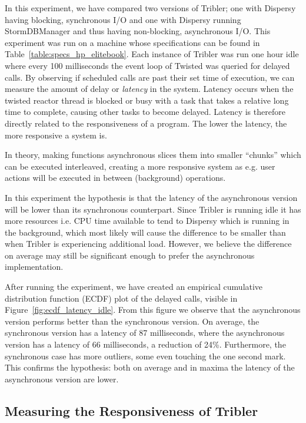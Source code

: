 In this experiment, we have compared two versions of Tribler; one with Dispersy having blocking, synchronous I/O and one with Dispersy running StormDBManager and thus having non-blocking, asynchronous I/O.
This experiment was run on a machine whose specifications can be found in Table~\ref{table:specs_hp_elitebook}.
Each instance of Tribler was run one hour idle where every 100 milliseconds the event loop of Twisted was queried for delayed calls.
By observing if scheduled calls are past their set time of execution, we can measure the amount of delay or \emph{latency} in the system.
Latency occurs when the twisted reactor thread is blocked or busy with a task that takes a relative long time to complete, causing other tasks to become delayed.
Latency is therefore directly related to the responsiveness of a program.
The lower the latency, the more responsive a system is.

In theory, making functions asynchronous slices them into smaller \enquote{chunks} which can be executed interleaved, creating a more responsive system as e.g. user actions will be executed in between (background) operations.

In this experiment the hypothesis is that the latency of the asynchronous version will be lower than its synchronous counterpart.
Since Tribler is running idle it has more resources i.e. CPU time available to tend to Dispersy which is running in the background, which most likely will cause the difference to be smaller than when Tribler is experiencing additional load.
However, we believe the difference on average may still be significant enough to prefer the asynchronous implementation.

After running the experiment, we have created an empirical cumulative distribution function (ECDF) plot of the delayed calls, visible in Figure~\ref{fig:ecdf_latency_idle}.
From this figure we observe that the asynchronous version performs better than the synchronous version.
On average, the synchronous version has a latency of 87 milliseconds, where the asynchronous version has a latency of 66 milliseconds, a reduction of 24\%.
Furthermore, the synchronous case has more outliers, some even touching the one second mark.
This confirms the hypothesis: both on average and in maxima the latency of the asynchronous version are lower.

\subsection{Measuring the Responsiveness of Tribler}
\label{sct:measuring_responsiveness_tribler}

